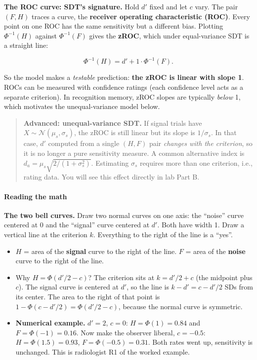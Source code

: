 \textbf{The ROC curve: SDT's signature.} Hold \(d'\) fixed and let \(c\)
vary. The pair \((F, H)\) traces a curve, the \textbf{receiver operating
characteristic (ROC)}. Every point on one ROC has the same sensitivity
but a different bias. Plotting \(\Phi^{-1}(H)\) against \(\Phi^{-1}(F)\)
gives the \textbf{zROC}, which under equal-variance SDT is a straight
line:

\[
\Phi^{-1}(H) = d' + 1 \cdot \Phi^{-1}(F).
\]

So the model makes a \emph{testable} prediction: \textbf{the zROC is
linear with slope 1}. ROCs can be measured with confidence ratings (each
confidence level acts as a separate criterion). In recognition memory,
zROC slopes are typically \emph{below} 1, which motivates the
unequal-variance model below.

\begin{quote}
\textbf{Advanced: unequal-variance SDT.} If signal trials have
\(X \sim \mathcal{N}(\mu_s, \sigma_s)\), the zROC is still linear but
its slope is \(1/\sigma_s\). In that case, \(d'\) computed from a single
\((H, F)\) pair \emph{changes with the criterion}, so it is no longer a
pure sensitivity measure. A common alternative index is
\(d_a = \mu_s \sqrt{2/(1+\sigma_s^2)}\). Estimating \(\sigma_s\)
requires more than one criterion, i.e., rating data. You will see this
effect directly in lab Part B.
\end{quote}

\paragraph{Reading the math}

\textbf{The two bell curves.} Draw two normal curves on one axis: the
``noise'' curve centered at 0 and the ``signal'' curve centered at
\(d'\). Both have width 1. Draw a vertical line at the criterion \(k\).
Everything to the right of the line is a ``yes''.

\begin{itemize}
\tightlist
\item
  \(H\) = area of the \textbf{signal} curve to the right of the line.
  \(F\) = area of the \textbf{noise} curve to the right of the line.
\item
  Why \(H = \Phi(d'/2 - c)\)? The criterion sits at \(k = d'/2 + c\)
  (the midpoint plus \(c\)). The signal curve is centered at \(d'\), so
  the line is \(k - d' = c - d'/2\) SDs from its center. The area to the
  right of that point is \(1 - \Phi(c - d'/2) = \Phi(d'/2 - c)\),
  because the normal curve is symmetric.
\item
  \textbf{Numerical example.} \(d' = 2\), \(c = 0\):
  \(H = \Phi(1) = 0.84\) and \(F = \Phi(-1) = 0.16\). Now make the
  observer liberal, \(c = -0.5\): \(H = \Phi(1.5) = 0.93\),
  \(F = \Phi(-0.5) = 0.31\). Both rates went up, sensitivity is
  unchanged. This is radiologist R1 of the worked example.
\end{itemize}

